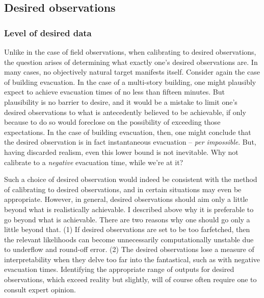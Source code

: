 \documentclass{article}
\begin{document}
\subsection{Desired observations}


\subsubsection{Level of desired data}
Unlike in the case of field observations, when calibrating to desired observations, the question arises of determining what exactly one's desired observations are. In many cases, no objectively natural target manifests itself. Consider again the case of building evacuation. In the case of a multi-story building, one might plausibly expect to achieve evacuation times of no less than fifteen minutes. But plausibility is no barrier to desire, and it would be a mistake to limit one's desired observations to what is antecedently believed to be achievable, if only because to do so would foreclose on the possibility of exceeding those expectations. In the case of building evacuation, then, one might conclude that the desired observation is in fact instantaneous evacuation -- \textit{per impossible}. But, having discarded realism, even this lower bound is not inevitable. Why not calibrate to a \emph{negative} evacuation time, while we're at it?

Such a choice of desired observation would indeed be consistent with the method of calibrating to desired observations, and in certain situations may even be appropriate. However, in general, desired observations should aim only a little beyond what is realistically achievable. I described above why it is preferable to go beyond what is achievable. There are two reasons why one should go only a little beyond that. (1) If desired observations are set to be too farfetched, then the relevant likelihoods can become unnecessarily computationally unstable due to underflow and round-off error. (2) The desired observations lose a measure of interpretability when they delve too far into the fantastical, such as with negative evacuation times. Identifying the appropriate range of outputs for desired observations, which exceed reality but slightly, will of course often require one to consult expert opinion. 
\end{document}
